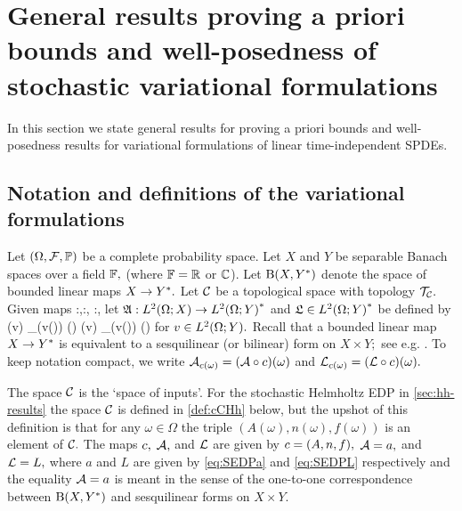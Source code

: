 \section[General stochastic a priori bounds and well-posedness]{General results proving a priori bounds and well-posedness of stochastic variational formulations}\label{sec:gen-framework}\label{sec:general}
In this section we state general results for proving a priori bounds and well-posedness results for variational formulations of linear time-independent SPDEs.

\subsection{Notation and definitions of the variational formulations}\label{sec:notdef}
Let $\OFP$ be a complete probability space. Let $X$ and $Y$ be separable Banach spaces over a field $\mathbb F,$ (where $\mathbb F = \mathbb R$ or $\mathbb C$).
Let $\homspace$ denote the space of bounded linear maps $X\rightarrow Y^{*}.$ Let $\mathcal C$ be a topological space with topology $\mathcal T_{\mathcal C}.$ Given maps
\beqs
\coeff:\Omega\rightarrow\cC,\quad\toform:\cC \rightarrow \homspace,\quad{} \rhs:\cC \rightarrow \Ys,
\eeqs let $\SAc:\LtOX \rightarrow \LtOYas$ and  $\SLc \in \LtOYas$ be defined by
\beq\label{eq:SA}
(v) \de \int_\Omega {}\big(v(\omega)\big) \dd\PP(\omega) \quad{} \quad 
\SLc(v) \de \int_\Omega \Lcomega\big(v(\omega)\big) \dd \PP(\omega)
\eeq
for $v \in \LtOY.$ Recall that a bounded linear map $X\rightarrow Y^{*}$ is equivalent to a sesquilinear (or bilinear) form on $X \times Y;$ see e.g. \cite[Lemma 2.1.38]{SaSc:11}. To keep notation compact, we write $\Acomega=(\toform \circ c)(\omega)$ and $\Lcomega=(\rhs\circ c)(\omega).$



The space $\mathcal C$ is the `space of inputs'. For the stochastic Helmholtz EDP in \cref{sec:hh-results} the space $\mathcal C$ is defined in \cref{def:cCHh} below, but the upshot of this definition is that for any $\omega \in \Omega$ the triple $(A(\omega),n(\omega),f(\omega))$ is an element of $\mathcal C.$
The maps $c,$ $\mathcal A,$ and $\mathcal L$ are given by $\coeff = \mleft(A,n,f\mright),$ $\mathcal A = a,$ and $\mathcal L = L,$ where $a$ and $L$ are given by \eqref{eq:SEDPa} and \eqref{eq:SEDPL} respectively and the equality $\mathcal A=a$ is meant in the sense of the one-to-one correspondence between $\homspace$ and sesquilinear forms on $X\times Y.$
\ere

